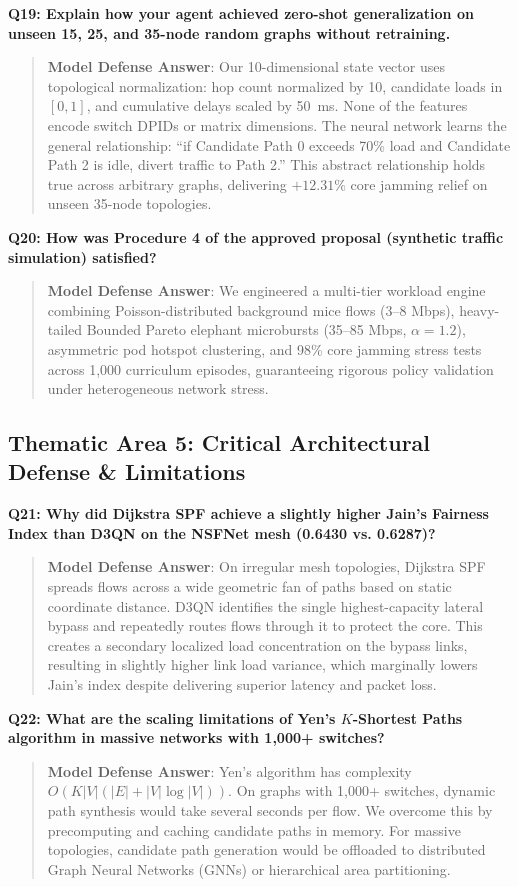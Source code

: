 \documentclass[12pt,a4paper,oneside]{report}
\begin{document}
\noindent\textbf{Q19: Explain how your agent achieved zero-shot generalization on unseen 15, 25, and 35-node random graphs without retraining.}
\begin{quote}
\small
\textbf{Model Defense Answer}: Our 10-dimensional state vector uses topological normalization: hop count normalized by 10, candidate loads in $[0, 1]$, and cumulative delays scaled by 50~ms. None of the features encode switch DPIDs or matrix dimensions. The neural network learns the general relationship: ``if Candidate Path 0 exceeds 70\% load and Candidate Path 2 is idle, divert traffic to Path 2.'' This abstract relationship holds true across arbitrary graphs, delivering $+12.31\%$ core jamming relief on unseen 35-node topologies.
\end{quote}

\noindent\textbf{Q20: How was Procedure 4 of the approved proposal (synthetic traffic simulation) satisfied?}
\begin{quote}
\small
\textbf{Model Defense Answer}: We engineered a multi-tier workload engine combining Poisson-distributed background mice flows (3--8 Mbps), heavy-tailed Bounded Pareto elephant microbursts (35--85 Mbps, $\alpha=1.2$), asymmetric pod hotspot clustering, and 98\% core jamming stress tests across 1,000 curriculum episodes, guaranteeing rigorous policy validation under heterogeneous network stress.
\end{quote}

\subsection{Thematic Area 5: Critical Architectural Defense & Limitations}

\noindent\textbf{Q21: Why did Dijkstra SPF achieve a slightly higher Jain's Fairness Index than D3QN on the NSFNet mesh (0.6430 vs. 0.6287)?}
\begin{quote}
\small
\textbf{Model Defense Answer}: On irregular mesh topologies, Dijkstra SPF spreads flows across a wide geometric fan of paths based on static coordinate distance. D3QN identifies the single highest-capacity lateral bypass and repeatedly routes flows through it to protect the core. This creates a secondary localized load concentration on the bypass links, resulting in slightly higher link load variance, which marginally lowers Jain's index despite delivering superior latency and packet loss.
\end{quote}

\noindent\textbf{Q22: What are the scaling limitations of Yen's $K$-Shortest Paths algorithm in massive networks with 1,000+ switches?}
\begin{quote}
\small
\textbf{Model Defense Answer}: Yen's algorithm has complexity $O(K |V| (|E| + |V| \log |V|))$. On graphs with 1,000+ switches, dynamic path synthesis would take several seconds per flow. We overcome this by precomputing and caching candidate paths in memory. For massive topologies, candidate path generation would be offloaded to distributed Graph Neural Networks (GNNs) or hierarchical area partitioning.
\end{quote}
\end{document}
